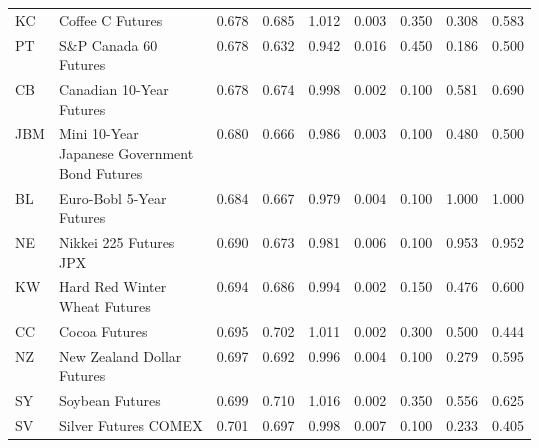 \begin{longtable}{llrrrrrrr}
  KC &                                           Coffee C Futures &        0.678 &       0.685 &     1.012 &        0.003 &           0.350 &                0.308 &      0.583 \\
  PT &                         \makecell{S\&P Canada 60\\Futures} &        0.678 &       0.632 &     0.942 &        0.016 &           0.450 &                0.186 &      0.500 \\
  CB &                       \makecell{Canadian 10-Year\\Futures} &        0.678 &       0.674 &     0.998 &        0.002 &           0.100 &                0.581 &      0.690 \\
 JBM & \makecell{Mini 10-Year\\Japanese Government\\Bond Futures} &        0.680 &       0.666 &     0.986 &        0.003 &           0.100 &                0.480 &      0.500 \\
  BL &                       \makecell{Euro-Bobl 5-Year\\Futures} &        0.684 &       0.667 &     0.979 &        0.004 &           0.100 &                1.000 &      1.000 \\
  NE &                         \makecell{Nikkei 225 Futures\\JPX} &        0.690 &       0.673 &     0.981 &        0.006 &           0.100 &                0.953 &      0.952 \\
  KW &                  \makecell{Hard Red Winter\\Wheat Futures} &        0.694 &       0.686 &     0.994 &        0.002 &           0.150 &                0.476 &      0.600 \\
  CC &                                              Cocoa Futures &        0.695 &       0.702 &     1.011 &        0.002 &           0.300 &                0.500 &      0.444 \\
  NZ &                     \makecell{New Zealand Dollar\\Futures} &        0.697 &       0.692 &     0.996 &        0.004 &           0.100 &                0.279 &      0.595 \\
  SY &                                            Soybean Futures &        0.699 &       0.710 &     1.016 &        0.002 &           0.350 &                0.556 &      0.625 \\
  SV &                                       Silver Futures COMEX &        0.701 &       0.697 &     0.998 &        0.007 &           0.100 &                0.233 &      0.405 \\

\end{longtable}

